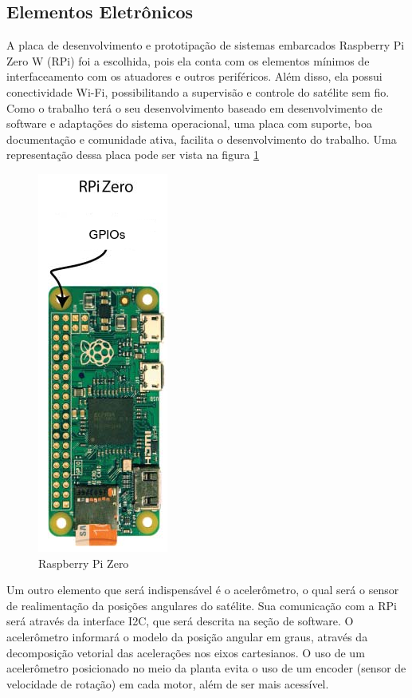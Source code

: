 
\subsection{Elementos Eletrônicos}

A placa de desenvolvimento e prototipação de sistemas embarcados Raspberry Pi Zero W (RPi) foi a escolhida, pois ela conta com os elementos mínimos de interfaceamento com os atuadores e outros periféricos. Além disso, ela possui conectividade Wi-Fi, possibilitando a supervisão e controle do satélite sem fio. Como o trabalho terá o seu desenvolvimento baseado em desenvolvimento de software e adaptações do sistema operacional, uma placa com suporte, boa documentação e comunidade ativa, facilita o desenvolvimento do trabalho. Uma representação dessa placa pode ser vista na figura \ref{fig:rasp_zero}

\begin{figure}[H]
  \caption{Raspberry Pi Zero}
  \begin{center}
      \includegraphics[scale=.55]{metodologia/img/rasp_zero}
  \end{center}
  \label{fig:rasp_zero}
\end{figure}

Um outro elemento que será indispensável é o acelerômetro, o qual será o sensor de realimentação da posições angulares do satélite. Sua comunicação com a RPi será através da interface I2C, que será descrita na seção de software. O acelerômetro informará o modelo da posição angular em graus, através da decomposição vetorial das acelerações nos eixos cartesianos. O uso de um acelerômetro posicionado no meio da planta evita o uso de um encoder (sensor de velocidade de rotação) em cada motor, além de ser mais acessível.

